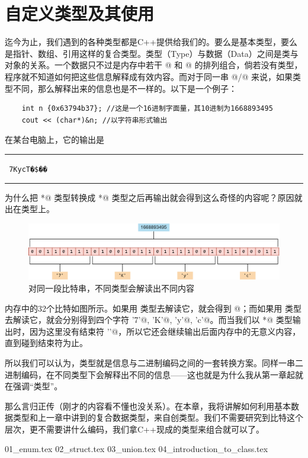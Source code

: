 \chapter{自定义类型及其使用}
迄今为止，我们遇到的各种类型都是C++提供给我们的。要么是基本类型，要么是指针、数组、引用这样的复合类型。类型（Type）与数据（Data）之间是类与对象的关系。一个数据只不过是内存中若干 @ 和 @ 的排列组合，倘若没有类型，程序就不知道如何把这些信息解释成有效内容。而对于同一串 @/@ 来说，如果类型不同，那么解释出来的信息也是不一样的。以下是一个例子：
\begin{lstlisting}
    int n {0x63794b37}; //这是一个16进制字面量，其10进制为1668893495
    cout << (char*)&n; //以字符串形式输出
\end{lstlisting}
在某台电脑上，它的输出是\\\noindent\rule{\linewidth}{.2pt}\texttt{
7KycT�\$��
}\\\noindent\rule{\linewidth}{.2pt}
为什么把 \lstinline@int*@ 类型转换成 \lstinline@char*@ 类型之后再输出就会得到这么奇怪的内容呢？原因就出在类型上。\par
\begin{figure}[htbp]
    \centering
    \includegraphics[width=\textwidth]{../images/generalized_parts/06_0_1_string_to_int_or_char_300.png}
    \caption{对同一段比特串，不同类型会解读出不同内容}
\end{figure}
内存中的32个比特如图所示。如果用 \lstinline@int@ 类型去解读它，就会得到 @；而如果用 \lstinline@char@ 类型去解读它，就会分别得到四个字符 \lstinline@'7'@, \lstinline@'K'@, \lstinline@'y'@, \lstinline@'c'@。而当我们以 \lstinline@char*@ 类型输出时，因为这里没有结束符 \lstinline@'\0'@，所以它还会继续输出后面内存中的无意义内容，直到碰到结束符为止。\par
所以我们可以认为，类型就是信息与二进制编码之间的一套转换方案。同样一串二进制编码，在不同类型下会解释出不同的信息——这也就是为什么我从第一章起就在强调``类型''。\par
那么言归正传（刚才的内容看不懂也没关系）。在本章，我将讲解如何利用基本数据类型和上一章中讲到的复合数据类型，来自创类型。我们不需要研究到比特这个层次，更不需要讲什么编码，我们拿C++现成的类型来组合就可以了。\par
{01_enum.tex}
{02_struct.tex}
{03_union.tex}
{04_introduction_to_class.tex}
